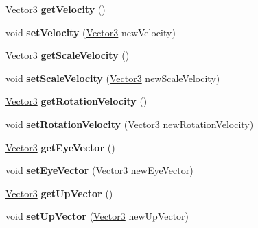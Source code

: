 \begin{DoxyCompactItemize}
\item 
\hypertarget{class_entity_ace81d20203e8644e6dd438ac2a6c4a59}{}\hyperlink{struct_vector3}{Vector3} {\bfseries get\+Velocity} ()\label{class_entity_ace81d20203e8644e6dd438ac2a6c4a59}

\item 
\hypertarget{class_entity_a9e46448e3328bdb6602b0f680edb12e0}{}void {\bfseries set\+Velocity} (\hyperlink{struct_vector3}{Vector3} new\+Velocity)\label{class_entity_a9e46448e3328bdb6602b0f680edb12e0}

\item 
\hypertarget{class_entity_a3c67d18672cbfb2a0190dea197dc09e0}{}\hyperlink{struct_vector3}{Vector3} {\bfseries get\+Scale\+Velocity} ()\label{class_entity_a3c67d18672cbfb2a0190dea197dc09e0}

\item 
\hypertarget{class_entity_a05af39fabdba6f2fda887bafc253eecc}{}void {\bfseries set\+Scale\+Velocity} (\hyperlink{struct_vector3}{Vector3} new\+Scale\+Velocity)\label{class_entity_a05af39fabdba6f2fda887bafc253eecc}

\item 
\hypertarget{class_entity_ae82bc820751faefaa363d77b12e68b46}{}\hyperlink{struct_vector3}{Vector3} {\bfseries get\+Rotation\+Velocity} ()\label{class_entity_ae82bc820751faefaa363d77b12e68b46}

\item 
\hypertarget{class_entity_a88c3bd5cfa53c5015d5dde07abef982b}{}void {\bfseries set\+Rotation\+Velocity} (\hyperlink{struct_vector3}{Vector3} new\+Rotation\+Velocity)\label{class_entity_a88c3bd5cfa53c5015d5dde07abef982b}

\item 
\hypertarget{class_entity_a751ac8dd25c0253862f5605a90647cb8}{}\hyperlink{struct_vector3}{Vector3} {\bfseries get\+Eye\+Vector} ()\label{class_entity_a751ac8dd25c0253862f5605a90647cb8}

\item 
\hypertarget{class_entity_a6851ac6681af20e5002498beb5c460b4}{}void {\bfseries set\+Eye\+Vector} (\hyperlink{struct_vector3}{Vector3} new\+Eye\+Vector)\label{class_entity_a6851ac6681af20e5002498beb5c460b4}

\item 
\hypertarget{class_entity_a8baad3640c4e9f84aac3a1455cfc3486}{}\hyperlink{struct_vector3}{Vector3} {\bfseries get\+Up\+Vector} ()\label{class_entity_a8baad3640c4e9f84aac3a1455cfc3486}

\item 
\hypertarget{class_entity_a55bde5ca34b393158054b75f4f987a63}{}void {\bfseries set\+Up\+Vector} (\hyperlink{struct_vector3}{Vector3} new\+Up\+Vector)\label{class_entity_a55bde5ca34b393158054b75f4f987a63}


\end{DoxyCompactItemize}
